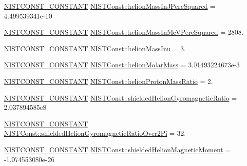 \begin{DoxyCompactItemize}
\item 
\mbox{\hyperlink{group___n_i_s_t_const-_macros_ga2b0fc1d7452373f816175dd86ce26729}{N\+I\+S\+T\+C\+O\+N\+S\+T\+\_\+\+C\+O\+N\+S\+T\+A\+NT}} \mbox{\hyperlink{group___n_i_s_t_const-_helion_gad94a56396a8e7dee7a863c10dcca4432}{N\+I\+S\+T\+Const\+::helion\+Mass\+In\+J\+Perc\+Squared}} = 4.\+499539341e-\/10
\item 
\mbox{\hyperlink{group___n_i_s_t_const-_macros_ga2b0fc1d7452373f816175dd86ce26729}{N\+I\+S\+T\+C\+O\+N\+S\+T\+\_\+\+C\+O\+N\+S\+T\+A\+NT}} \mbox{\hyperlink{group___n_i_s_t_const-_helion_ga769838db6411df944c625c2c123597b5}{N\+I\+S\+T\+Const\+::helion\+Mass\+In\+Me\+V\+Perc\+Squared}} = 2808.
\item 
\mbox{\hyperlink{group___n_i_s_t_const-_macros_ga2b0fc1d7452373f816175dd86ce26729}{N\+I\+S\+T\+C\+O\+N\+S\+T\+\_\+\+C\+O\+N\+S\+T\+A\+NT}} \mbox{\hyperlink{group___n_i_s_t_const-_helion_ga6a7b83837aedeb0fc0e2c4640253d1cb}{N\+I\+S\+T\+Const\+::helion\+Mass\+Inu}} = 3.
\item 
\mbox{\hyperlink{group___n_i_s_t_const-_macros_ga2b0fc1d7452373f816175dd86ce26729}{N\+I\+S\+T\+C\+O\+N\+S\+T\+\_\+\+C\+O\+N\+S\+T\+A\+NT}} \mbox{\hyperlink{group___n_i_s_t_const-_helion_ga9bf06c78bcf918e6d6e46539b1dc0ce1}{N\+I\+S\+T\+Const\+::helion\+Molar\+Mass}} = 3.\+01493224673e-\/3
\item 
\mbox{\hyperlink{group___n_i_s_t_const-_macros_ga2b0fc1d7452373f816175dd86ce26729}{N\+I\+S\+T\+C\+O\+N\+S\+T\+\_\+\+C\+O\+N\+S\+T\+A\+NT}} \mbox{\hyperlink{group___n_i_s_t_const-_helion_ga23660bb2e50738f34033e672a99e1194}{N\+I\+S\+T\+Const\+::helion\+Proton\+Mass\+Ratio}} = 2.
\item 
\mbox{\hyperlink{group___n_i_s_t_const-_macros_ga2b0fc1d7452373f816175dd86ce26729}{N\+I\+S\+T\+C\+O\+N\+S\+T\+\_\+\+C\+O\+N\+S\+T\+A\+NT}} \mbox{\hyperlink{group___n_i_s_t_const-_helion_ga642741fc0aa8b2966b78b252304d521c}{N\+I\+S\+T\+Const\+::shielded\+Helion\+Gyromagnetic\+Ratio}} = 2.\+037894585e8
\item 
\mbox{\hyperlink{group___n_i_s_t_const-_macros_ga2b0fc1d7452373f816175dd86ce26729}{N\+I\+S\+T\+C\+O\+N\+S\+T\+\_\+\+C\+O\+N\+S\+T\+A\+NT}} \mbox{\hyperlink{group___n_i_s_t_const-_helion_gae89da246fab4d96613f6365bc4c895cf}{N\+I\+S\+T\+Const\+::shielded\+Helion\+Gyromagnetic\+Ratio\+Over2\+Pi}} = 32.
\item 
\mbox{\hyperlink{group___n_i_s_t_const-_macros_ga2b0fc1d7452373f816175dd86ce26729}{N\+I\+S\+T\+C\+O\+N\+S\+T\+\_\+\+C\+O\+N\+S\+T\+A\+NT}} \mbox{\hyperlink{group___n_i_s_t_const-_helion_ga425da6143b23f32e91a4bed842e2f6d5}{N\+I\+S\+T\+Const\+::shielded\+Helion\+Magnetic\+Moment}} = -\/1.\+074553080e-\/26

\end{DoxyCompactItemize}
